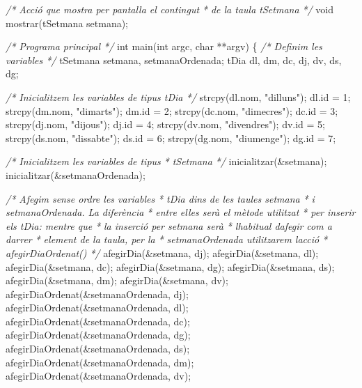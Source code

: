 \documentclass[
]{book}
\newenvironment{Shaded}{\begin{snugshade}}{\end{snugshade}}
\newcommand{\CommentTok}[1]{\textcolor[rgb]{0.56,0.35,0.01}{\textit{#1}}}
\newcommand{\DataTypeTok}[1]{\textcolor[rgb]{0.13,0.29,0.53}{#1}}
\newcommand{\DecValTok}[1]{\textcolor[rgb]{0.00,0.00,0.81}{#1}}
\newcommand{\NormalTok}[1]{#1}
\newcommand{\StringTok}[1]{\textcolor[rgb]{0.31,0.60,0.02}{#1}}
\begin{document}
\begin{Shaded}
\begin{Highlighting}[]
\CommentTok{/* Acció que mostra per pantalla el contingut}
\CommentTok{ * de la taula tSetmana }
\CommentTok{ */}
\DataTypeTok{void}\NormalTok{ mostrar(tSetmana setmana);}

\CommentTok{/* Programa principal */}
\DataTypeTok{int}\NormalTok{ main(}\DataTypeTok{int}\NormalTok{ argc, }\DataTypeTok{char}\NormalTok{ **argv) \{}
    \CommentTok{/* Definim les variables */}
\NormalTok{    tSetmana setmana, setmanaOrdenada;}
\NormalTok{    tDia dl, dm, dc, dj, dv, ds, dg; }
    
    \CommentTok{/* Inicialitzem les variables de tipus tDia */}
\NormalTok{    strcpy(dl.nom, }\StringTok{"dilluns"}\NormalTok{);}
\NormalTok{    dl.id = }\DecValTok{1}\NormalTok{;}
\NormalTok{    strcpy(dm.nom, }\StringTok{"dimarts"}\NormalTok{);}
\NormalTok{    dm.id = }\DecValTok{2}\NormalTok{;}
\NormalTok{    strcpy(dc.nom, }\StringTok{"dimecres"}\NormalTok{);}
\NormalTok{    dc.id = }\DecValTok{3}\NormalTok{;}
\NormalTok{    strcpy(dj.nom, }\StringTok{"dijous"}\NormalTok{);}
\NormalTok{    dj.id = }\DecValTok{4}\NormalTok{;}
\NormalTok{    strcpy(dv.nom, }\StringTok{"divendres"}\NormalTok{);}
\NormalTok{    dv.id = }\DecValTok{5}\NormalTok{;}
\NormalTok{    strcpy(ds.nom, }\StringTok{"dissabte"}\NormalTok{);}
\NormalTok{    ds.id = }\DecValTok{6}\NormalTok{;}
\NormalTok{    strcpy(dg.nom, }\StringTok{"diumenge"}\NormalTok{);}
\NormalTok{    dg.id = }\DecValTok{7}\NormalTok{;}
    
    \CommentTok{/* Inicialitzem les variables de tipus}
\CommentTok{     * tSetmana }
\CommentTok{     */}
\NormalTok{    inicialitzar(\&setmana);}
\NormalTok{    inicialitzar(\&setmanaOrdenada);}
    
    \CommentTok{/* Afegim sense ordre les variables}
\CommentTok{     * tDia dins de les taules setmana}
\CommentTok{     * i setmanaOrdenada. La diferència}
\CommentTok{     * entre elles serà el mètode utilitzat}
\CommentTok{     * per inserir els tDia: mentre que }
\CommentTok{     * la inserció per setmana serà }
\CommentTok{     * l\textquotesingle{}habitual d\textquotesingle{}afegir com a darrer}
\CommentTok{     * element de la taula, per la }
\CommentTok{     * setmanaOrdenada utilitzarem l\textquotesingle{}acció}
\CommentTok{     * afegirDiaOrdenat()}
\CommentTok{     */}
\NormalTok{    afegirDia(\&setmana, dj);}
\NormalTok{    afegirDia(\&setmana, dl);}
\NormalTok{    afegirDia(\&setmana, dc);}
\NormalTok{    afegirDia(\&setmana, dg);}
\NormalTok{    afegirDia(\&setmana, ds);}
\NormalTok{    afegirDia(\&setmana, dm);}
\NormalTok{    afegirDia(\&setmana, dv);}
\NormalTok{    afegirDiaOrdenat(\&setmanaOrdenada, dj);}
\NormalTok{    afegirDiaOrdenat(\&setmanaOrdenada, dl);    }
\NormalTok{    afegirDiaOrdenat(\&setmanaOrdenada, dc);}
\NormalTok{    afegirDiaOrdenat(\&setmanaOrdenada, dg);}
\NormalTok{    afegirDiaOrdenat(\&setmanaOrdenada, ds);}
\NormalTok{    afegirDiaOrdenat(\&setmanaOrdenada, dm);}
\NormalTok{    afegirDiaOrdenat(\&setmanaOrdenada, dv);}


\end{Highlighting}
\end{Shaded}
\end{document}
